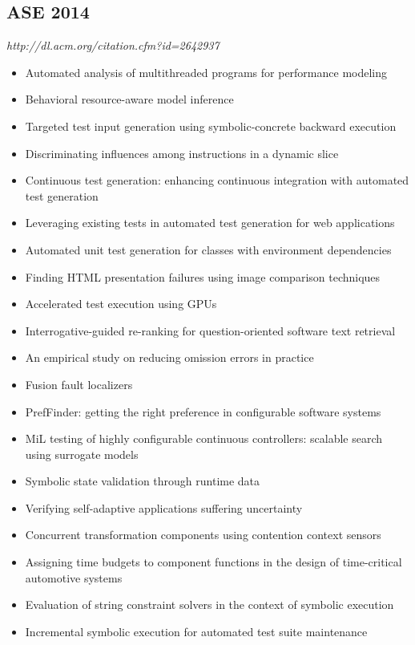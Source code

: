 \subsection{ASE 2014}

{\small \em http://dl.acm.org/citation.cfm?id=2642937}

{\small
\begin{itemize}[itemsep=-1ex]
  \item Automated analysis of multithreaded programs for performance modeling
  \item Behavioral resource-aware model inference
  \item Targeted test input generation using symbolic-concrete backward execution
  \item Discriminating influences among instructions in a dynamic slice
  \item Continuous test generation: enhancing continuous integration with automated test generation
  \item Leveraging existing tests in automated test generation for web applications
  \item Automated unit test generation for classes with environment dependencies
  \item Finding HTML presentation failures using image comparison techniques
  \item Accelerated test execution using GPUs
  \item Interrogative-guided re-ranking for question-oriented software text retrieval
  \item An empirical study on reducing omission errors in practice
  \item Fusion fault localizers
  \item PrefFinder: getting the right preference in configurable software systems
  \item MiL testing of highly configurable continuous controllers: scalable search using surrogate models
  \item Symbolic state validation through runtime data
  \item Verifying self-adaptive applications suffering uncertainty
  \item Concurrent transformation components using contention context sensors
  \item Assigning time budgets to component functions in the design of time-critical automotive systems
  \item Evaluation of string constraint solvers in the context of symbolic execution
  \item Incremental symbolic execution for automated test suite maintenance

\end{itemize}}

